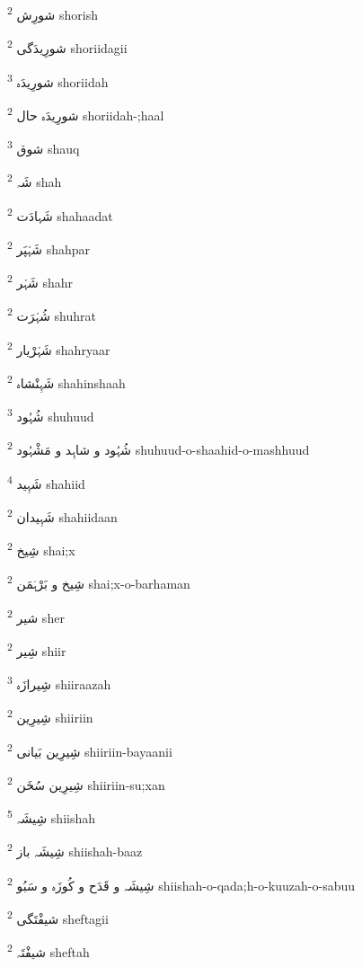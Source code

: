 \documentclass[12pt]{article}
\begin{document}
\begin{multicols}{5}
{\ur شورِش}   \textsuperscript{2} shorish

{\ur شورِیدَگی}   \textsuperscript{2} shoriidagii

{\ur شورِیدَہ}   \textsuperscript{3} shoriidah

{\ur شورِیدَہ حال}   \textsuperscript{2} shoriidah-;haal

{\ur شوق}   \textsuperscript{3} shauq

{\ur شَہ}   \textsuperscript{2} shah

{\ur شَہادَت}   \textsuperscript{2} shahaadat

{\ur شَہْپَر}   \textsuperscript{2} shahpar

{\ur شَہْر}   \textsuperscript{2} shahr

{\ur شُہْرَت}   \textsuperscript{2} shuhrat

{\ur شَہْرْیار}   \textsuperscript{2} shahryaar

{\ur شَہِنْشاہ}   \textsuperscript{2} shahinshaah

{\ur شُہُود}   \textsuperscript{3} shuhuud

{\ur شُہُود و شاہِد و مَشْہُود}   \textsuperscript{2} shuhuud-o-shaahid-o-mashhuud

{\ur شَہِید}   \textsuperscript{4} shahiid

{\ur شَہِیدان}   \textsuperscript{2} shahiidaan

{\ur شِیخ}   \textsuperscript{2} shai;x

{\ur شِیخ و بَرْہَمَن}   \textsuperscript{2} shai;x-o-barhaman

{\ur شیر}   \textsuperscript{2} sher

{\ur شِیر}   \textsuperscript{2} shiir

{\ur شِیرازَہ}   \textsuperscript{3} shiiraazah

{\ur شِیرِین}   \textsuperscript{2} shiiriin

{\ur شِیرِین بَیانی}   \textsuperscript{2} shiiriin-bayaanii

{\ur شِیرِین سُخَن}   \textsuperscript{2} shiiriin-su;xan

{\ur شِیشَہ}   \textsuperscript{5} shiishah

{\ur شِیشَہ باز}   \textsuperscript{2} shiishah-baaz

{\ur شِیشَہ و قَدَح و کُوزَہ و سَبُو}   \textsuperscript{2} shiishah-o-qada;h-o-kuuzah-o-sabuu

{\ur شیفْتَگی}   \textsuperscript{2} sheftagii

{\ur شیفْتَہ}   \textsuperscript{2} sheftah


\end{multicols}
\end{document}
